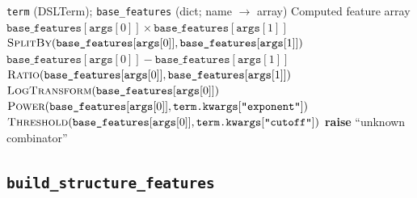 \documentclass[11pt,a4paper]{article}
\begin{document}
\begin{algorithm}[H]
\caption{\textsc{ComputeCompoundFeature}}\label{alg:compute-compound}
\begin{algorithmic}[1]
\Require \texttt{term} (DSLTerm); \texttt{base\_features} (dict; name $\to$ array)
\Ensure Computed feature array
    \State \hspace{2em} \Return $\texttt{base\_features}[\texttt{args}[0]] \times \texttt{base\_features}[\texttt{args}[1]]$
    \State \hspace{2em} \Return $\Call{SplitBy}{\texttt{base\_features}[\texttt{args}[0]], \texttt{base\_features}[\texttt{args}[1]]}$
    \State \hspace{2em} \Return $\texttt{base\_features}[\texttt{args}[0]] - \texttt{base\_features}[\texttt{args}[1]]$
    \State \hspace{2em} \Return $\Call{Ratio}{\texttt{base\_features}[\texttt{args}[0]], \texttt{base\_features}[\texttt{args}[1]]}$
    \State \hspace{2em} \Return $\Call{LogTransform}{\texttt{base\_features}[\texttt{args}[0]]}$
    \State \hspace{2em} \Return $\Call{Power}{\texttt{base\_features}[\texttt{args}[0]], \texttt{term.kwargs}[\texttt{"exponent"}]}$
    \State \hspace{2em} \Return $\Call{Threshold}{\texttt{base\_features}[\texttt{args}[0]], \texttt{term.kwargs}[\texttt{"cutoff"}]}$
\Else
    \State \hspace{2em} \textbf{raise} ``unknown combinator''
\EndIf
\end{algorithmic}
\end{algorithm}

\subsection{\texttt{build\_structure\_features}}
\end{document}
